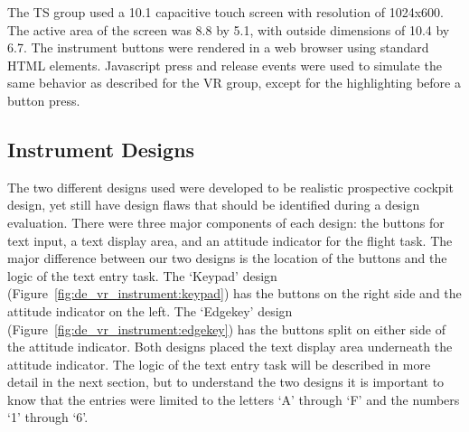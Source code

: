 The TS group used a \SI{10.1}{\inch} capacitive touch screen with resolution of 1024x600.
The active area of the screen was \SI{8.8}{\inch} by \SI{5.1}{\inch}, with outside dimensions of \SI{10.4}{\inch} by \SI{6.7}{\inch}.
The instrument buttons were rendered in a web browser using standard HTML elements.
Javascript press and release events were used to simulate the same behavior as described for the VR group, except for the highlighting before a button press.

\subsection{Instrument Designs}

The two different designs used were developed to be realistic prospective cockpit design, yet still have design flaws that should be identified during a design evaluation.
There were three major components of each design: the buttons for text input, a text display area, and an attitude indicator for the flight task.
The major difference between our two designs is the location of the buttons and the logic of the text entry task.
The `Keypad' design (Figure~\ref{fig:de_vr_instrument:keypad}) has the buttons on the right side and the attitude indicator on the left.
The `Edgekey' design (Figure~\ref{fig:de_vr_instrument:edgekey}) has the buttons split on either side of the attitude indicator.
Both designs placed the text display area underneath the attitude indicator.
The logic of the text entry task will be described in more detail in the next section, but to understand the two designs it is important to know that the entries were limited to the letters `A' through `F' and the numbers `1' through `6'.


